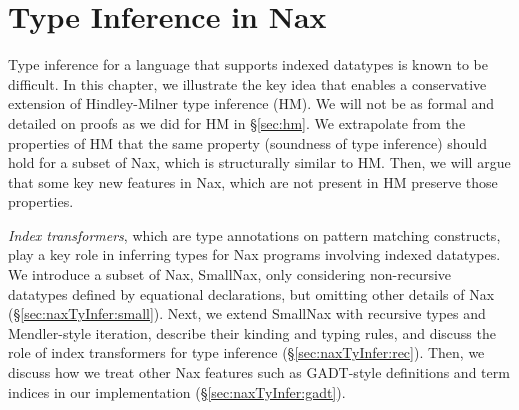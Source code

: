 \chapter{Type Inference in Nax} \label{ch:naxTyInfer}
Type inference for a language that supports indexed datatypes is known
to be difficult. In this chapter, we illustrate the key idea that
enables a conservative extension of Hindley-Milner type inference (HM).
We will not be as formal and detailed on proofs as we did for HM
in \S\ref{sec:hm}. We extrapolate from the properties of HM that
the same property (soundness of type inference) should hold for
a subset of Nax, which is structurally similar to HM. Then, we will
argue that some key new features in Nax, which are not present in HM
preserve those properties.

\emph{Index transformers}, which are type annotations on pattern matching
constructs, play a key role in inferring types for Nax programs involving
indexed datatypes. We introduce a subset of Nax, SmallNax, only considering
non-recursive datatypes defined by equational declarations, but omitting other
details of Nax (\S\ref{sec:naxTyInfer:small}). Next, we extend SmallNax with
recursive types and Mendler-style iteration, describe their kinding and
typing rules, and discuss the role of index transformers for type inference
(\S\ref{sec:naxTyInfer:rec}). Then, we discuss how we treat other Nax features
such as GADT-style definitions and term indices in our implementation
(\S\ref{sec:naxTyInfer:gadt}).


